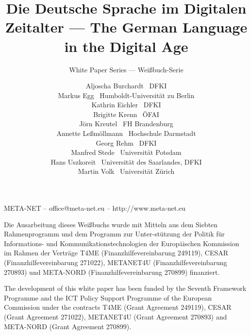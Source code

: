 \documentclass[]{../../metanetpaper}
\title{Die Deutsche Sprache im Digitalen Zeitalter --- The German Language in the Digital Age}
\subtitle{White Paper Series --- Weißbuch-Serie}
\author{
  Aljoscha Burchardt~ {\small DFKI}\\
  Markus Egg~ {\small Humboldt-Universität zu Berlin}\\
  Kathrin Eichler~ {\small DFKI} \\
  Brigitte Krenn~ {\small ÖFAI}\\
  Jörn Kreutel~ {\small FH Brandenburg}\\
  Annette Leßmöllmann~ {\small Hochschule Darmstadt}\\
  Georg Rehm~ {\small DFKI} \\
  Manfred Stede~ {\small Universität Potsdam}\\
  Hans Uszkoreit~ {\small Universität des Saarlandes, DFKI} \\
  Martin Volk~ {\small Universität Zürich}
}
\begin{document}
\maketitle
\null
\pagestyle{empty} 

\centerline{META-NET -- office@meta-net.eu -- http://www.meta-net.eu}

\vfill

\begin{small}
  Die Ausarbeitung dieses Weißbuchs wurde mit Mitteln aus dem Siebten
  Rahmenprogramm und dem Programm zur Unter-stützung der Politik für
  Informations- und Kommunikationstechnologien der Europäischen
  Kommission im Rahmen der Verträge T4ME (Finanzhilfevereinbarung
  249119), CESAR (Finanzhilfevereinbarung 271022), METANET4U
  (Finanzhilfevereinbarung 270893) und META-NORD
  (Finanzhilfevereinbarung 270899) finanziert.
\end{small}

\bigskip
\begin{small}
  The development of this white paper has been funded by the Seventh
  Framework Programme and the ICT Policy Support Programme of the
  European Commission under the contracts T4ME (Grant Agreement 249119),
  CESAR (Grant Agreement 271022), METANET4U (Grant Agreement 270893)
  and META-NORD (Grant Agreement 270899).
\end{small}

\clearpage

\setcounter{page}{5}
\pagestyle{scrheadings}

\cleardoublepage

\end{document}
